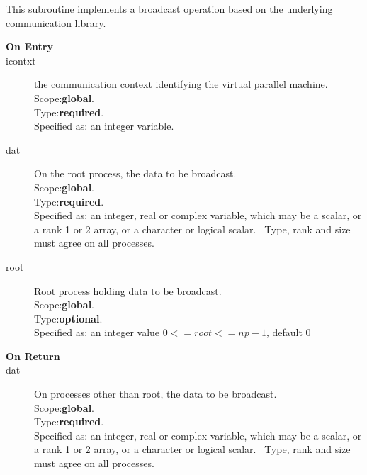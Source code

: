 This subroutine implements a broadcast operation based on the
underlying communication library. 
\begin{description}
\item[\bf  On Entry ]
\item[icontxt] the communication context identifying the virtual
  parallel machine.\\
Scope:{\bf global}.\\
Type:{\bf required}.\\
Specified as: an integer variable.
\item[dat] On the root process, the data to be broadcast.\\
Scope:{\bf global}.\\
Type:{\bf required}.\\
Specified as: an integer, real or complex variable, which may be a
scalar, or a rank 1 or 2 array, or a character or logical scalar. \
Type, rank and size must agree on all processes.
\item[root] Root process holding data to be broadcast.\\
Scope:{\bf global}.\\
Type:{\bf optional}.\\
Specified as: an integer value $0<= root <= np-1$, default 0 \
\end{description}


\begin{description}
\item[\bf On Return]
\item[dat] On processes other than  root, the data to be broadcast.\\
Scope:{\bf global}.\\
Type:{\bf required}.\\
Specified as: an integer, real or complex variable, which may be a
scalar, or a rank 1 or 2 array, or a character or logical scalar. \
Type, rank and size must agree on all processes.
\end{description}




